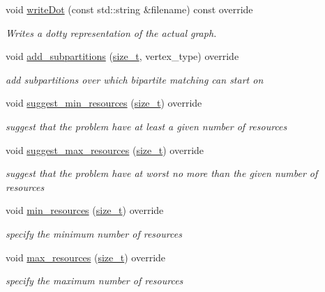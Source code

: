 \begin{DoxyCompactItemize}
$$void \hyperlink{classcoloring__based__clique__covering_a6dfe0da70979e9851a95d247b9847c32}{write\+Dot} (const std\+::string \&filename) const override
\begin{DoxyCompactList}\small\item\em Writes a dotty representation of the actual graph. \end{DoxyCompactList}\item 
void \hyperlink{classcoloring__based__clique__covering_a4e3275c690b4dfb9ee16e66091beeccf}{add\+\_\+subpartitions} (\hyperlink{tutorial__fpt__2017_2intro_2sixth_2test_8c_a7c94ea6f8948649f8d181ae55911eeaf}{size\+\_\+t}, vertex\+\_\+type) override
\begin{DoxyCompactList}\small\item\em add subpartitions over which bipartite matching can start on \end{DoxyCompactList}\item 
void \hyperlink{classcoloring__based__clique__covering_a37ef2c0e027bac18b114b98fd7e97519}{suggest\+\_\+min\+\_\+resources} (\hyperlink{tutorial__fpt__2017_2intro_2sixth_2test_8c_a7c94ea6f8948649f8d181ae55911eeaf}{size\+\_\+t}) override
\begin{DoxyCompactList}\small\item\em suggest that the problem have at least a given number of resources \end{DoxyCompactList}\item 
void \hyperlink{classcoloring__based__clique__covering_a8ebd9dc934acf7724e6793398991ad94}{suggest\+\_\+max\+\_\+resources} (\hyperlink{tutorial__fpt__2017_2intro_2sixth_2test_8c_a7c94ea6f8948649f8d181ae55911eeaf}{size\+\_\+t}) override
\begin{DoxyCompactList}\small\item\em suggest that the problem have at worst no more than the given number of resources \end{DoxyCompactList}\item 
void \hyperlink{classcoloring__based__clique__covering_a3c62b282cc45d953e778193beca5b5d4}{min\+\_\+resources} (\hyperlink{tutorial__fpt__2017_2intro_2sixth_2test_8c_a7c94ea6f8948649f8d181ae55911eeaf}{size\+\_\+t}) override
\begin{DoxyCompactList}\small\item\em specify the minimum number of resources \end{DoxyCompactList}\item 
void \hyperlink{classcoloring__based__clique__covering_ab2975cc7163940660b65d3c0b967cf9b}{max\+\_\+resources} (\hyperlink{tutorial__fpt__2017_2intro_2sixth_2test_8c_a7c94ea6f8948649f8d181ae55911eeaf}{size\+\_\+t}) override
\begin{DoxyCompactList}\small\item\em specify the maximum number of resources \end{DoxyCompactList}\end{DoxyCompactItemize}
